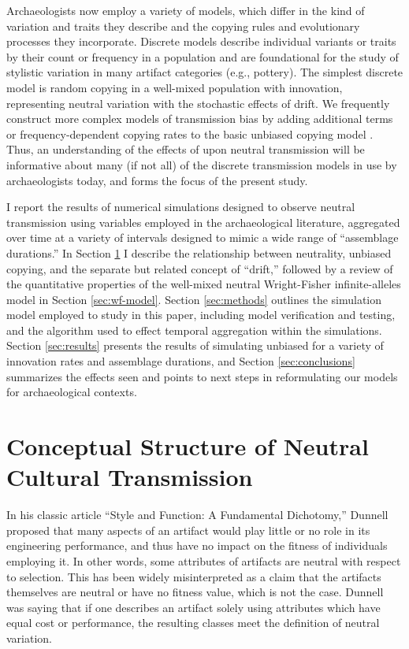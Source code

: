 Archaeologists now employ a variety of \ct models, which differ in the kind of variation and traits they describe and the copying rules and evolutionary processes they incorporate.  Discrete models describe individual variants or traits by their count or frequency in a population and are foundational for the study of stylistic variation in many artifact categories (e.g., pottery).  The simplest discrete  model is random copying in a well-mixed population with innovation, representing neutral variation with the stochastic effects of drift.  We frequently construct more complex models of transmission bias by adding additional terms or frequency-dependent copying rates to the basic unbiased copying model \citep{cavalli1973cultural,cavalli1973models,CF1981,BR1985}.  Thus, an understanding of the effects of \timeav upon neutral transmission will be informative about many (if not all) of the discrete transmission models in use by archaeologists today, and forms the focus of the present study.  

I report the results of numerical simulations designed to observe neutral transmission using variables employed in the archaeological literature, aggregated over time at a variety of intervals designed to mimic a wide range of ``assemblage durations.''  In Section \ref{sec:concept-review} I describe the relationship between neutrality, unbiased copying, and the separate but related concept of ``drift,'' followed by a review of the quantitative properties of the well-mixed neutral Wright-Fisher infinite-alleles model in Section \ref{sec:wf-model}.  Section \ref{sec:methods} outlines the simulation model employed to study \timeav in this paper, including model verification and testing, and the algorithm used to effect temporal aggregation within the simulations.  Section \ref{sec:results} presents the results of simulating unbiased \ct for a variety of innovation rates and assemblage durations, and Section \ref{sec:conclusions} summarizes the effects seen and points to next steps in reformulating our \ct models for archaeological contexts.  


\section{Conceptual Structure of Neutral Cultural Transmission}
\label{sec:concept-review}

In his classic article “Style and Function: A Fundamental Dichotomy,” Dunnell \citeyearpar{8961} proposed that many aspects of an artifact would play little or no role in its engineering performance, and thus have no impact on the fitness of individuals employing it. In other words, some attributes of artifacts are neutral with respect to selection.  This has been widely misinterpreted as a claim that the artifacts themselves are neutral or have no fitness value, which is not the case. Dunnell was saying that if one describes an artifact solely using attributes which have equal cost or performance, the resulting classes meet the definition of neutral variation.  

